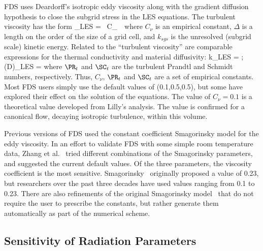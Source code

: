 \documentclass[11pt]{book}
\begin{document}
FDS uses Deardorff's isotropic eddy viscosity along with the gradient diffusion hypothesis to close the subgrid stress in the LES equations.  The turbulent viscosity has the form
\be
  \mu_{\hbox{\tiny LES}} =  \rho \,  C_{\nu}\, \Delta \, 
\ee
where $C_{\nu}$  is an empirical constant, $\Delta$ is a length on the order of the size of a grid cell, and $k_{sgs}$ is the unresolved (subgrid scale) kinetic energy. Related to the ``turbulent  viscosity'' are  comparable expressions  for  the thermal conductivity  and  material diffusivity:
\be
   k_{\hbox{\tiny LES}}  = 
   \quad   ;  \quad  (\rho D)_{\hbox{\tiny  LES}}  =
\ee
where $\PR_t$ and $\SC_t$ are the turbulent Prandtl and Schmidt numbers, respectively. Thus, $C_{\nu}$, $\PR_t$ and $\SC_t$ are a set of empirical constants.  Most FDS users simply use the default values of (0.1,0.5,0.5), but some have explored their effect on the solution of the equations.  The value of $C_{\nu}=0.1$ is a theoretical value developed from Lilly's analysis.  The value is confirmed for a canonical flow, decaying isotropic turbulence, within this volume.

Previous versions of FDS used the constant coefficient Smagorinsky model for the eddy viscosity. In an effort to validate FDS with some simple room temperature data, Zhang et al.~\cite{Zhang:2} tried different combinations of the Smagorinsky parameters, and suggested the current  default values. Of the  three parameters, the viscosity coefficient is the most sensitive.  Smagorinsky~\cite{Smagorinsky:1} originally proposed  a value of 0.23, but researchers over the past  three decades have used values ranging from 0.1 to 0.23. There are also refinements of the original Smagorinsky model~\cite{Germano:1,Lilly:1,Moin:1991} that do not require the user to prescribe the constants, but rather generate them automatically as part of the numerical scheme.

\subsection{Sensitivity of Radiation Parameters}
\end{document}
